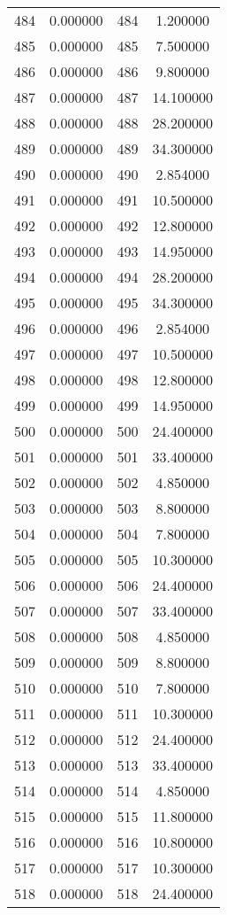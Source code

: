 \documentclass[12pt]{article}
\begin{document}
\begin{longtable}{@{}cccc@{}}
484 & 0.000000 & 484 & 1.200000 \\
485 & 0.000000 & 485 & 7.500000 \\
486 & 0.000000 & 486 & 9.800000 \\
487 & 0.000000 & 487 & 14.100000 \\
488 & 0.000000 & 488 & 28.200000 \\
489 & 0.000000 & 489 & 34.300000 \\
490 & 0.000000 & 490 & 2.854000 \\
491 & 0.000000 & 491 & 10.500000 \\
492 & 0.000000 & 492 & 12.800000 \\
493 & 0.000000 & 493 & 14.950000 \\
494 & 0.000000 & 494 & 28.200000 \\
495 & 0.000000 & 495 & 34.300000 \\
496 & 0.000000 & 496 & 2.854000 \\
497 & 0.000000 & 497 & 10.500000 \\
498 & 0.000000 & 498 & 12.800000 \\
499 & 0.000000 & 499 & 14.950000 \\
500 & 0.000000 & 500 & 24.400000 \\
501 & 0.000000 & 501 & 33.400000 \\
502 & 0.000000 & 502 & 4.850000 \\
503 & 0.000000 & 503 & 8.800000 \\
504 & 0.000000 & 504 & 7.800000 \\
505 & 0.000000 & 505 & 10.300000 \\
506 & 0.000000 & 506 & 24.400000 \\
507 & 0.000000 & 507 & 33.400000 \\
508 & 0.000000 & 508 & 4.850000 \\
509 & 0.000000 & 509 & 8.800000 \\
510 & 0.000000 & 510 & 7.800000 \\
511 & 0.000000 & 511 & 10.300000 \\
512 & 0.000000 & 512 & 24.400000 \\
513 & 0.000000 & 513 & 33.400000 \\
514 & 0.000000 & 514 & 4.850000 \\
515 & 0.000000 & 515 & 11.800000 \\
516 & 0.000000 & 516 & 10.800000 \\
517 & 0.000000 & 517 & 10.300000 \\
518 & 0.000000 & 518 & 24.400000 \\

\end{longtable}
\end{document}
